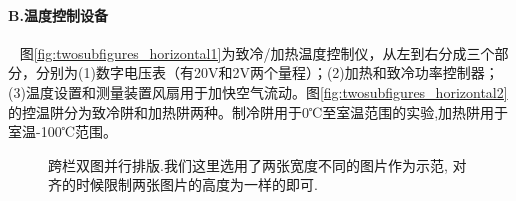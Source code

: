 \documentclass[10pt,a4paper,twocolumn,twoside,UTF8]{ctexart}
\begin{document}
	\paragraph{B.温度控制设备}~
	\newline
	\indent 图\ref{fig:twosubfigures_horizontal1}为致冷/加热温度控制仪，从左到右分成三个部分，分别为(1)数字电压表（有20V和2V两个量程）；(2)加热和致冷功率控制器；(3)温度设置和测量装置风扇用于加快空气流动。图\ref{fig:twosubfigures_horizontal2}的控温阱分为致冷阱和加热阱两种。制冷阱用于0℃至室温范围的实验,加热阱用于室温-100℃范围。

	\begin{figure}[htbp]
		\centering
		\caption{跨栏双图并行排版.我们这里选用了两张宽度不同的图片作为示范, 对齐的时候限制两张图片的高度为一样的即可.}
		\label{fig:twosubfigures_horizontal}
	\end{figure}
\end{document}
